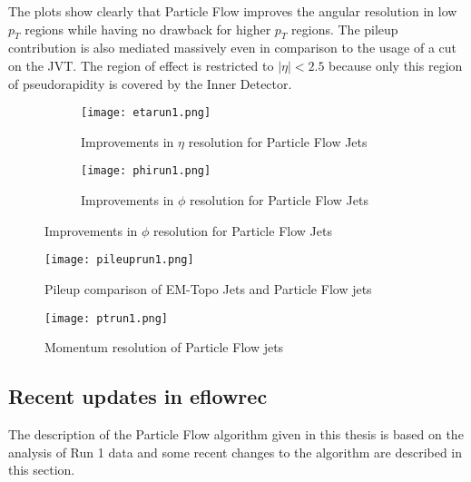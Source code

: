 The plots show clearly that Particle Flow improves the angular resolution in low $p_T$ regions while having no drawback for higher $p_T$ regions. The pileup contribution is also mediated massively even in comparison to the usage of a cut on the JVT. The region of effect is restricted to $|\eta|<\num{2.5}$ because only this region of pseudorapidity is covered by the Inner Detector.

\begin{figure}[h]
  \centering
  \begin{subfigure}[b]{0.5\figwidth}
  \texttt{[image: etarun1.png]}
  \caption[Improvements in $\eta$ resolution for Particle Flow Jets]{Improvements in $\eta$ resolution for Particle Flow Jets \cite{pflow16}}
  \label{fig:etarun1}
  \end{subfigure}
  \begin{subfigure}[b]{0.5\figwidth}
  \texttt{[image: phirun1.png]}
  \caption[Improvements in $\phi$ resolution for Particle Flow Jets]{Improvements in $\phi$ resolution for Particle Flow Jets \cite{pflow16}}
  \label{fig:phirun1}
  \end{subfigure}
\end{figure}

\begin{figure}[h]
  \centering
  \texttt{[image: pileuprun1.png]}
  \caption[Pileup comparison of EM-Topo Jets and Particle Flow jets]{Pileup comparison of EM-Topo Jets and Particle Flow jets \cite{pflow16}}
  \label{fig:pileuprun1}
\end{figure}

\begin{figure}
\centering
\texttt{[image: ptrun1.png]}
\caption[Momentum resolution of Particle Flow]{Momentum resolution of Particle Flow jets \cite{pflow16}}
\label{fig:ptrun1}
\end{figure}



\subsection{Recent updates in eflowrec}

The description of the Particle Flow algorithm given in this thesis is based on the analysis of Run 1 data and some recent changes to the algorithm are described in this section.


